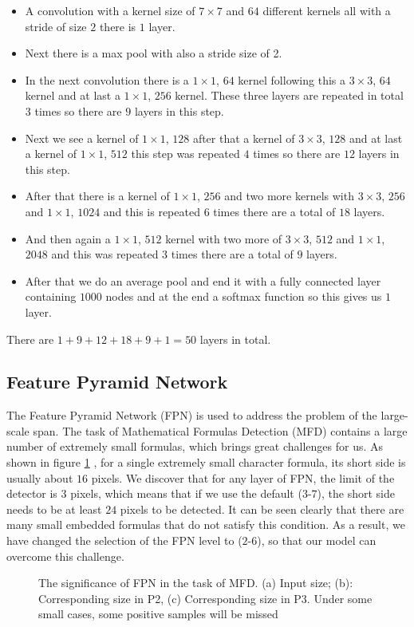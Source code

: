 \begin{itemize}
\item A convolution with a kernel size of $7 \times 7$ and $64$ different kernels all with a stride of size $2$ there is $1$ layer.
\item Next there is a max pool with also a stride size of 2.
\item In the next convolution there is a $1 \times 1$, $64$ kernel following this a $3 \times 3$, $64$ kernel and at last a $1 \times 1$, $256$ kernel. These three layers are repeated in total $3$ times so there are $9$ layers in this step.
\item Next we see a kernel of $1 \times 1$, $128$ after that a kernel of $3 \times 3$, $128$ and at last a kernel of $1 \times 1$, $512$ this step was repeated $4$ times so there are $12$ layers in this step.
\item After that there is a kernel of $1 \times 1$, $256$ and two more kernels with $3 \times 3$, $256$ and $1 \times 1$, $1024$ and this is repeated $6$ times there are a total of $18$ layers.
\item And then again a $1 \times 1$, $512$ kernel with two more of $3 \times 3$, $512$ and $1 \times 1$, $2048$ and this was repeated $3$ times there are a total of $9$ layers.
\item After that we do an average pool and end it with a fully connected layer containing $1000$ nodes and at the end a softmax function so this gives us $1$ layer.
\end{itemize}
There are $1 + 9 + 12 + 18 + 9 + 1 = 50$ layers in total.
\subsection{Feature Pyramid Network}
The Feature Pyramid Network (FPN) is used to address the problem of the large-scale span. The task of Mathematical Formulas Detection (MFD) contains a large number of extremely small formulas, which brings great challenges for us. As shown in figure \ref{fpn} \cite{1stprize}, for a single extremely small character formula, its short side is usually about $16$ pixels. We discover that for any layer of FPN, the limit of the detector is $3$ pixels, which means that if we use the default ($3$-$7$), the short side needs to be at least $24$ pixels to be detected. It can be seen clearly that there are many small embedded formulas that do not satisfy this condition. As a result, we have changed the selection of the FPN level to ($2$-$6$), so that our model can overcome this challenge.
\begin{figure}[H]
\caption{The significance of FPN in the task of MFD. (a) Input size; (b): Corresponding size in P2, (c) Corresponding size in P3. Under some small cases, some positive samples will be missed \cite{1stprize}}
\label{fpn}
\end{figure}
